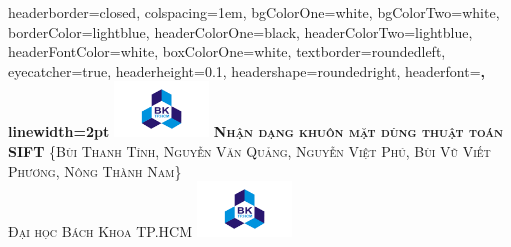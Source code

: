 \documentclass[landscape,a0paper,fontscale=0.285]{baposter} %
\begin{document}
\begin{poster}
{
headerborder=closed, %
colspacing=1em, %
bgColorOne=white, %
bgColorTwo=white, %
borderColor=lightblue, %
headerColorOne=black, %
headerColorTwo=lightblue, %
headerFontColor=white, %
boxColorOne=white, %
textborder=roundedleft, %
eyecatcher=true, %
headerheight=0.1\textheight, %
headershape=roundedright, %
headerfont=\Large\bf\textsc, %
linewidth=2pt %
}
%
{\includegraphics[height=4em]{logo.png}} %
{\bf\textsc{Nhận dạng khuôn mặt dùng thuật toán SIFT}\vspace{0.5em}} %
{\textsc{\{Bùi Thanh Tính, Nguyễn Văn Quảng, Nguyễn Việt Phú, Bùi Vũ Viết Phương, Nông Thành Nam\} 
\\
\hspace{12pt} Đại học Bách Khoa TP.HCM}} %
{\includegraphics[height=4em]{logo.png}} %



\end{poster}
\end{document}
